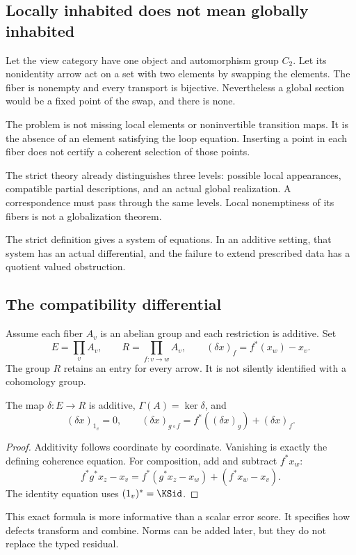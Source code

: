 \subsection{Locally inhabited does not mean globally inhabited}
\begin{KSexample}\label{KS:KS07}
Let the view category have one object and automorphism group \(C_2\). Let its nonidentity arrow act on a set with two elements by swapping the elements. The fiber is nonempty and every transport is bijective. Nevertheless a global section would be a fixed point of the swap, and there is none.
\end{KSexample}
The problem is not missing local elements or noninvertible transition maps. It is the absence of an element satisfying the loop equation. Inserting a point in each fiber does not certify a coherent selection of those points.

\begin{insight}
The strict theory already distinguishes three levels: possible local appearances, compatible partial descriptions, and an actual global realization. A correspondence must pass through the same levels. Local nonemptiness of its fibers is not a globalization theorem.
\end{insight}



\label{KS:sec:obstruction}
The strict definition gives a system of equations. In an additive setting, that system has an actual differential, and the failure to extend prescribed data has a quotient valued obstruction.

\subsection{The compatibility differential}
Assume each fiber \(A_v\) is an abelian group and each restriction is additive. Set
\[
 E=\prod_v A_v,\qquad R=\prod_{f:v\to w}A_v,
 \qquad (\delta x)_f=f^*(x_w)-x_v.
\]
The group \(R\) retains an entry for every arrow. It is not silently identified with a cohomology group.

\begin{KSproposition}\label{KS:KS08}
The map \(\delta:E\to R\) is additive, \(\Gamma(A)=\ker\delta\), and
\[
 (\delta x)_{1_v}=0,\qquad
 (\delta x)_{g\circ f}=f^*((\delta x)_g)+(\delta x)_f.
\]
\end{KSproposition}
\begin{proof}
Additivity follows coordinate by coordinate. Vanishing is exactly the defining coherence equation. For composition, add and subtract \(f^*x_w\):
\[
 f^*g^*x_z-x_v
 =f^*(g^*x_z-x_w)+(f^*x_w-x_v).
\]
The identity equation uses \((1_v)^*=\KSid\).
\end{proof}
This exact formula is more informative than a scalar error score. It specifies how defects transform and combine. Norms can be added later, but they do not replace the typed residual.

